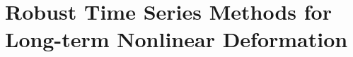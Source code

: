 


\chapter{Robust Time Series Methods for Long-term Nonlinear Deformation}
\label{CHAP:5-atmo-noise}





